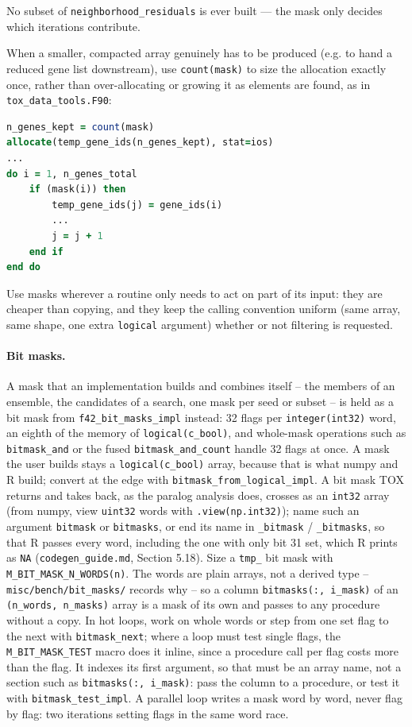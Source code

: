 \documentclass{article}
\begin{document}
No subset of \texttt{neighborhood\_residuals} is ever built — the mask only decides which iterations contribute.

When a smaller, compacted array genuinely has to be produced (e.g. to hand a reduced gene list downstream), use \texttt{count(mask)} to size the allocation exactly once, rather than over-allocating or growing it as elements are found, as in \texttt{tox\_data\_tools.F90}:

\begin{lstlisting}[language=Fortran]
n_genes_kept = count(mask)
allocate(temp_gene_ids(n_genes_kept), stat=ios)
...
do i = 1, n_genes_total
    if (mask(i)) then
        temp_gene_ids(j) = gene_ids(i)
        ...
        j = j + 1
    end if
end do
\end{lstlisting}

Use masks wherever a routine only needs to act on part of its input: they are cheaper than copying, and they keep the calling convention uniform (same array, same shape, one extra \texttt{logical} argument) whether or not filtering is requested.

\paragraph{Bit masks.} A mask that an implementation builds and combines itself -- the members of an ensemble, the candidates of a search, one mask per seed or subset -- is held as a bit mask from \texttt{f42\_bit\_masks\_impl} instead: 32 flags per \texttt{integer(int32)} word, an eighth of the memory of \texttt{logical(c\_bool)}, and whole-mask operations such as \texttt{bitmask\_and} or the fused \texttt{bitmask\_and\_count} handle 32 flags at once. A mask the user builds stays a \texttt{logical(c\_bool)} array, because that is what numpy and R build; convert at the edge with \texttt{bitmask\_from\_logical\_impl}. A bit mask TOX returns and takes back, as the paralog analysis does, crosses as an \texttt{int32} array (from numpy, view \texttt{uint32} words with \texttt{.view(np.int32)}); name such an argument \texttt{bitmask} or \texttt{bitmasks}, or end its name in \texttt{\_bitmask} / \texttt{\_bitmasks}, so that R passes every word, including the one with only bit 31 set, which R prints as \texttt{NA} (\texttt{codegen\_guide.md}, Section 5.18). Size a \texttt{tmp\_} bit mask with \texttt{M\_BIT\_MASK\_N\_WORDS(n)}. The words are plain arrays, not a derived type -- \texttt{misc/bench/bit\_masks/} records why -- so a column \texttt{bitmasks(:, i\_mask)} of an \texttt{(n\_words, n\_masks)} array is a mask of its own and passes to any procedure without a copy. In hot loops, work on whole words or step from one set flag to the next with \texttt{bitmask\_next}; where a loop must test single flags, the \texttt{M\_BIT\_MASK\_TEST} macro does it inline, since a procedure call per flag costs more than the flag. It indexes its first argument, so that must be an array name, not a section such as \texttt{bitmasks(:, i\_mask)}: pass the column to a procedure, or test it with \texttt{bitmask\_test\_impl}. A parallel loop writes a mask word by word, never flag by flag: two iterations setting flags in the same word race.
\end{document}
